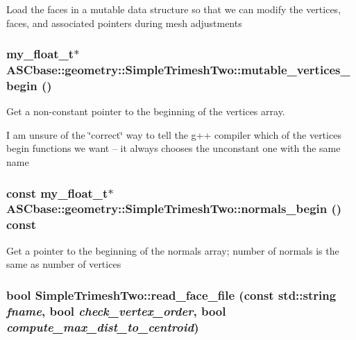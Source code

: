 Load the faces in a mutable data structure so that we can modify the vertices, faces, and associated pointers during mesh adjustments 
\subsubsection{\setlength{\rightskip}{0pt plus 5cm}my\_\-float\_\-t$\ast$ ASCbase::geometry::Simple\-Trimesh\-Two::mutable\_\-vertices\_\-begin ()\hspace{0.3cm}{\tt  [inline, protected]}}\label{classASCbase_1_1geometry_1_1SimpleTrimeshTwo_18ef85d591b174d42f848ede475e2268}


Get a non-constant pointer to the beginning of the vertices array. 

I am unsure of the \char`\"{}correct\char`\"{} way to tell the g++ compiler which of the vertices begin functions we want -- it always chooses the unconstant one with the same name 
\subsubsection{\setlength{\rightskip}{0pt plus 5cm}const my\_\-float\_\-t$\ast$ ASCbase::geometry::Simple\-Trimesh\-Two::normals\_\-begin () const\hspace{0.3cm}{\tt  [inline]}}\label{classASCbase_1_1geometry_1_1SimpleTrimeshTwo_b217b72c8e69c61f286c958da6439093}


Get a pointer to the beginning of the normals array; number of normals is the same as number of vertices 
\subsubsection{\setlength{\rightskip}{0pt plus 5cm}bool Simple\-Trimesh\-Two::read\_\-face\_\-file (const std::string {\em fname}, bool {\em check\_\-vertex\_\-order}, bool {\em compute\_\-max\_\-dist\_\-to\_\-centroid})\hspace{0.3cm}{\tt  [protected]}}\label{classASCbase_1_1geometry_1_1SimpleTrimeshTwo_81ecdfec18b36033de2e791107dfe69f}


